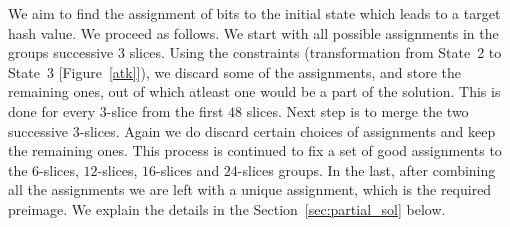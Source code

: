 We aim to find the assignment of bits to the initial state which leads to a target hash value. We proceed as follows. We start with all possible assignments in the groups successive $3$ slices. Using the constraints (transformation from State~2 to State~3 [Figure~\ref{atk}]), we discard some of the assignments, and store the remaining ones, out of which atleast one would be a part of the solution. This is done for every $3$-slice from the first $48$ slices. Next step is to merge the two successive $3$-slices. Again we do discard certain choices of assignments and keep the remaining ones. This process is continued to fix a set of good assignments to the $6$-slices, $12$-slices, $16$-slices and $24$-slices groups. In the last, after combining all the assignments we are left with a unique assignment, which is the required preimage. We explain the details in the Section~\ref{sec:partial_sol} below. 

